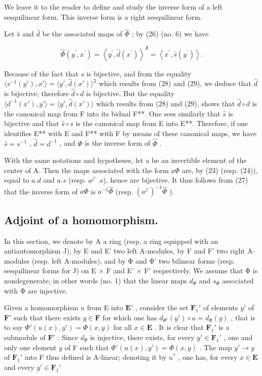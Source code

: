 We leave it to the reader to define and study the inverse form of a left sesquilinear form. This inverse form is a right sesquilinear form.

Let \(\hat{s}\) and \(\hat{d}\) be the associated maps of \(\hat{\Phi}\) ; by (26) (no. 6) we have

\[
\hat {\Phi} (y ^ {\prime}, x ^ {\prime}) = \left\langle y ^ {\prime}, \hat {d} (x ^ {\prime}) \right\rangle^ {\mathbf {J}} = \left\langle x ^ {\prime}, \hat {s} (y ^ {\prime}) \right\rangle .\tag{29}
\]

Because of the fact that \(s\) is bijective, and from the equality \(\langle s^{-1}(y'), x'\rangle = \langle y', \hat{d}(x') \rangle^{\mathfrak{J}}\) which results from (28) and (29), we deduce that \(\hat{d}\) is bijective; therefore \(\hat{d} \circ d\) is bijective. But the equality \(\langle d^{-1}(x'), y' \rangle = \langle y', \hat{d}(x') \rangle\) which results from (28) and (29), shows that \(\hat{d} \circ d\) is the canonical map from F into its bidual F**. One sees similarly that \(\hat{s}\) is bijective and that \(\hat{s} \circ s\) is the canonical map from E into E**. Therefore, if one identifies E** with E and F** with F by means of these canonical maps, we have \(\hat{s} = s^{-1}\) , \(\hat{d} = d^{-1}\) , and \(\Phi\) is the inverse form of \(\hat{\Phi}\) .

With the same notations and hypotheses, let a be an invertible element of the center of A. Then the maps associated with the form \(a\Phi\) are, by (23) (resp. (24)), equal to \(a.d\) and \(a.s\) (resp. \(a^{j'}\) .s), hence are bijective. It thus follows from (27) that the inverse form of \(a\Phi\) is \(a^{-1}\widehat{\Phi}\) (resp. \((a^{j'})^{-1}\widehat{\Phi}\) ).

\subsection{Adjoint of a homomorphism.}

In this section, we denote by A a ring (resp. a ring equipped with an antiautomorphism J), by E and E' two left A-modules, by F and F' two right A-modules (resp. left A-modules), and by Φ and Φ' two bilinear forms (resp. sesquilinear forms for J) on E × F and E' × F' respectively. We assume that Φ is nondegenerate, in other words (no. 1) that the linear maps \(d_{\Phi}\) and \(s_{\Phi}\) associated with Φ are injective.

Given a homomorphism \(u\) from E into \(\mathbf{E}'\) , consider the set \(\mathbf{F}_{1}'\) of elements \(y'\) of \(\mathbf{F}'\) such that there exists \(y \in \mathbf{F}\) for which one has \(d_{\Phi'}(y') \circ u = d_{\Phi}(y)\) , that is to say \(\Phi'(u(x), y') = \Phi(x, y)\) for all \(x \in \mathbf{E}\) . It is clear that \(\mathbf{F}_{1}'\) is a submodule of \(\mathbf{F}'\) . Since \(d_{\Phi}\) is injective, there exists, for every \(y' \in \mathbf{F}_{1}'\) , one and only one element \(y\) of F such that \(\Phi'(u(x), y') = \Phi(x, y)\) . The map \(y' \to y\) of \(\mathbf{F}_{1}'\) into F thus defined is A-linear; denoting it by \(u^{*}\) , one has, for every \(x \in \mathbf{E}\) and every \(y' \in \mathbf{F}_{1}'\)

